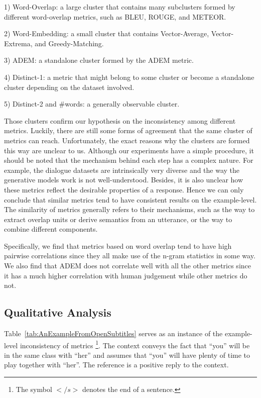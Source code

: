 \documentclass[conference]{IEEEtran}
\begin{document}
1) Word-Overlap: a large cluster that contains many subclusters formed by different word-overlap metrics, such as BLEU, ROUGE, and METEOR.

2) Word-Embedding: a small cluster that contains Vector-Average, Vector-Extrema, and Greedy-Matching.

3) ADEM: a standalone cluster formed by the ADEM metric.

4) Distinct-1: a metric that might belong to some cluster or become a standalone cluster depending on the dataset involved.

5) Distinct-2 and \#words: a generally observable cluster.

Those clusters confirm our hypothesis on the inconsistency among different metrics.
Luckily, there are still some forms of agreement that the same cluster of metrics can reach.
Unfortunately, the exact reasons why the clusters are formed this way are unclear to us.
Although our experiments have a simple procedure, it should be noted that the mechanism behind each step has a complex nature.
For example, the dialogue datasets are intrinsically very diverse and the way the generative models work is not well-understood.
Besides, it is also unclear how these metrics reflect the desirable properties of a response.
Hence we can only conclude that similar metrics tend to have consistent results on the example-level.
The similarity of metrics generally refers to their mechanisms, such as the way to extract overlap units or derive semantics from an utterance, or the way to combine different components.

Specifically, we find that metrics based on word overlap tend to have high pairwise correlations since they all make use of the n-gram statistics in some way.
We also find that ADEM does not correlate well with all the other metrics since it has a much higher correlation with human judgement while other metrics do not.

\subsection{Qualitative Analysis}

Table~\ref{tab:AnExampleFromOpenSubtitles} serves as an instance of the example-level inconsistency of metrics
\footnote{The symbol $</s>$ denotes the end of a sentence.}.
The context conveys the fact that ``you'' will be in the same class with ``her''
and assumes that ``you'' will have plenty of time to play together with ``her''.
The reference is a positive reply to the context.
\end{document}
